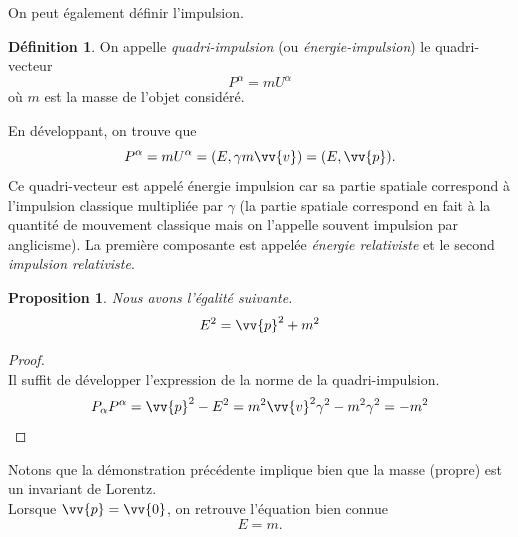 \documentclass[a4paper,11pt]{report}
\theoremstyle{definition}
\theoremstyle{plain}
\newtheorem{prop}[thm]{Proposition}
\theoremstyle{definition}
\newtheorem{defn}{Définition}[chapter]
\theoremstyle{remark}
\begin{document}
            On peut également définir l'impulsion.
            \begin{defn}
                On appelle \textit{quadri-impulsion} (ou \textit{énergie-impulsion}) le quadri-vecteur 
                \begin{equation}
                    P^\alpha = mU^\alpha
                \end{equation}
                où $m$ est la masse de l'objet considéré.
            \end{defn}
            En développant, on trouve que
            \begin{equation}
                P^\alpha = m U^\alpha = (E,\gamma m\vv{v}) = (E,\vv{p}).
            \end{equation}
            Ce quadri-vecteur est appelé énergie impulsion car sa partie spatiale correspond à l'impulsion classique multipliée par $\gamma$ (la partie spatiale correspond en fait à la quantité de mouvement classique mais on l'appelle souvent impulsion par anglicisme). La première composante est appelée \textit{énergie relativiste} et le second \textit{impulsion relativiste}.
            
            \begin{prop}
                Nous avons l'égalité suivante.
                \begin{equation}
                    E^2 = \vv{p}^2 + m^2
                \end{equation}
            \end{prop}
            \begin{proof}
            ${}$\\
                Il suffit de développer l'expression de la norme de la quadri-impulsion.
                \begin{equation}
                P_\alpha P^\alpha = \vv{p}^2-E^2 = m^2\vv{v}^2\gamma^2-m^2\gamma^2 = -m^2
            \end{equation}
            \end{proof}
            
            Notons que la démonstration précédente implique bien que la masse (propre) est un invariant de Lorentz.\\
            
            Lorsque $\vv{p} = \vv{0}$, on retrouve l'équation bien connue
            \begin{equation}
                E = m.
            \end{equation}
            
\end{document}
